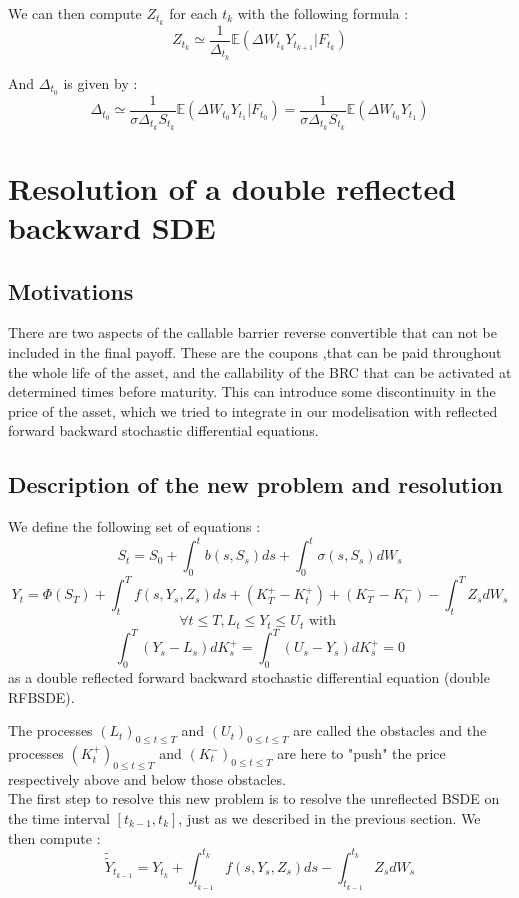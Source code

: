 \documentclass[a4paper,11pt,english]{book}
\begin{document}
We can then compute $Z_{t_k}$ for each $t_{k}$ with the following formula :
\begin{equation}
    Z_{t_k} \simeq \frac{1}{\Delta_{t_k}}\mathbb{E}(\Delta W_{t_k} Y_{t_{k+1}}|F_{t_k})
\end{equation}

And $\Delta_{t_0}$ is given by :
$$\Delta_{t_0} \simeq \frac{1}{\sigma \Delta_{t_k} S_{t_k}}\mathbb{E}(\Delta W_{t_0} Y_{t_{1}}|F_{t_0})=\frac{1}{\sigma \Delta_{t_k} S_{t_k}}\mathbb{E}(\Delta W_{t_0} Y_{t_{1}})$$

\section{Resolution of a double reflected backward SDE}
\subsection{Motivations}
There are two aspects of the callable barrier reverse convertible that can not be included in the final payoff. These are the coupons ,that can be paid throughout the whole life of the asset, and the callability of the BRC that can be activated at determined times before maturity. This can introduce some discontinuity in the price of the asset, which we tried to integrate in our modelisation with reflected forward backward stochastic differential equations.
\subsection{Description of the new problem and resolution}
We define the following set of equations :
$$S_{t}=S_{0} + \int_{0}^{t}b(s,S_{s})ds + \int_{0}^{t}\sigma(s,S_{s})dW_{s}$$
$$Y_{t}=\Phi(S_{T})+\int_{t}^{T}f(s,Y_{s},Z_{s})ds+(K_{T}^{+}-K_{t}^{+})+(K_{T}^{-}-K_{t}^{-})-\int_{t}^{T}Z_{s}dW_{s}$$
$$\forall t\leq T, L_{t}\leq Y_{t}\leq U_{t} \text{ with }$$ $$\int_{0}^{T}(Y_{s}-L_{s})dK_{s}^{+}=\int_{0}^{T}(U_{s}-Y_{s})dK_{s}^{+}=0$$
as a double reflected forward backward stochastic differential equation (double RFBSDE).

The processes $(L_{t})_{0\leq t \leq T}$ and $(U_{t})_{0\leq t \leq T}$ are called the obstacles and the processes $(K_{t}^{+})_{0\leq t \leq T}$ and $(K_{t}^{-})_{0\leq t \leq T}$ are here to "push" the price respectively above and below those obstacles. \\

The first step to resolve this new problem is to resolve the unreflected BSDE on the time interval $[t_{k-1},t_{k}]$, just as we described in the previous section. We then compute : $$\widetilde{\widetilde{Y}}_{t_{k-1}}=Y_{t_{k}}+\int_{t_{k-1}}^{t_{k}}f(s,Y_{s},Z_{s})ds-\int_{t_{k-1}}^{t_{k}}Z_{s}dW_{s}$$
\end{document}
